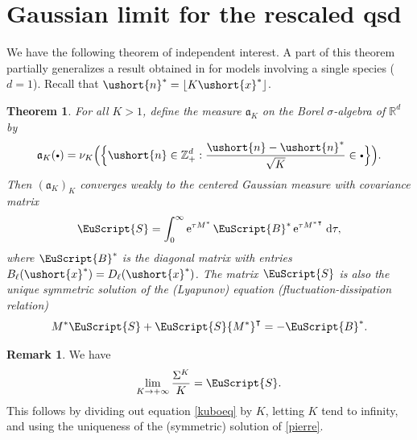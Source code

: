 \documentclass[10pt]{amsart}
\newcommand{\sbullet}{{\scriptscriptstyle\bullet}}
\newcommand{\csbullet}{{\raisebox{1pt}{$\sbullet$}}}
\numberwithin{equation}{section}
\theoremstyle{plain}
\newtheorem{theorem}{Theorem}[section]
\theoremstyle{definition}
\newtheorem{remark}{Remark}[section]
\newcommand{\real}{\mathbb{R}}
\newcommand{\zentiers}{{\mathbb{Z}}}
\newcommand{\domaine}{\zentiers_{+}^{d}}
\newcommand{\sK}{K}
\newcommand{\vecn}{\ushort{n}}
\newcommand{\vecnf}{\ushort{n}^*}
\newcommand{\vecxf}{\ushort{x}^*}
\newcommand{\nuk}{\nu_{K}}\let\snuk\nuk
\newcommand{\e}{\operatorname{e}}
\newcommand{\dd}{\hspace{1pt}\mathrm{d}}
\begin{document}
\section{Gaussian limit for the rescaled qsd}

We have the following theorem of independent interest. A part of this theorem partially generalizes a result obtained
in \cite{ccm1} for models involving a single species ($d=1$). Recall that $\vecnf = \lfloor K\vecxf \rfloor$.
\begin{theorem}
\label{confinement}
For all $K>1$, define the measure $\mathfrak{a}_K$ on the Borel $\sigma$-algebra of $\real^d$ by
\[
\mathfrak{a}_{\sK}(\csbullet)=\nuk\Bigl(\Bigl\{ \vecn\in \domaine : \frac{\vecn-\vecnf}{\sqrt{K}}\in \csbullet\Bigr\}\Bigr).
\]
Then $(\mathfrak{a}_{\sK})_{\sK}$ converges weakly to the centered Gaussian measure with covariance matrix
\[
\EuScript{S}=\int_{0}^{\infty}\e^{\tau M^*}\EuScript{B}^*\e^{\tau {M^*}^{\intercal}}\dd\tau,
\]
where $\EuScript{B}^*$ is the diagonal matrix with entries $B_{\ell}(\vecxf)=D_{\ell}(\vecxf)$.
The matrix $\EuScript{S}$ is also the unique symmetric solution of the (Lyapunov)
equation (fluctuation-dissipation relation)
\begin{equation}\label{pierre}
M^* \EuScript{S}+\EuScript{S} {M^*}^{\intercal}=-\EuScript{B}^*.
\end{equation}
\end{theorem}

\begin{remark}
We have
\[
\lim_{\sK\to+\infty} \frac{\Sigma^{\sK}}{K}=\EuScript{S}.
\]
This follows by dividing out equation \eqref{kuboeq} by $K$, letting $K$ tend to infinity, and using the uniqueness
of the (symmetric) solution of \eqref{pierre}.
\end{remark}
\end{document}
